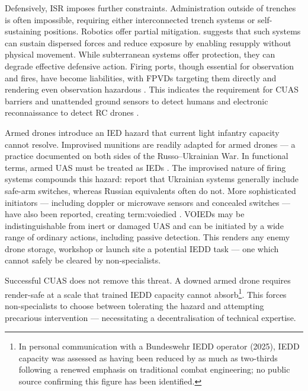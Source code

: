 Defensively, ISR imposes further constraints. Administration outside of trenches is often impossible, requiring either interconnected trench systems or self-sustaining positions. Robotics offer partial mitigation. \textcite[57]{Watling_book} suggests that such systems can sustain dispersed forces and reduce exposure by enabling resupply without physical movement. While subterranean systems offer protection, they can degrade effective defensive action. Firing ports, though essential for observation and fires, have become liabilities, with FPVDs targeting them directly and rendering even observation hazardous \parencite{neron_bancel_2024_05_27,Tyshchenko_2026_03_20_ukraine_bunker_story}. This indicates the requirement for CUAS barriers and unattended ground sensors to detect humans and electronic reconnaissance to detect RC drones \parencite[59]{ZABRODSKYI_2022}.



Armed drones introduce an IED hazard that current light infantry capacity cannot resolve. Improvised munitions are readily adapted for armed drones --- a practice documented on both sides of the Russo--Ukrainian War. In functional terms, armed UAS must be treated as IEDs \parencite{DORD_2022,danny_participant_5}. The improvised nature of firing systems compounds this hazard: \textcite{civdiv_8,dan_participant_1} report that Ukrainian systems generally include safe-arm switches, whereas Russian equivalents often do not. More sophisticated initiators --- including doppler or microwave sensors and concealed switches --- have also been reported, creating \gls{term:voiedied} \parencite{terrogence_2026_1,Terrogence_doppler_radar_initiation_ukraine_2026}. VOIEDs may be indistinguishable from inert or damaged UAS and can be initiated by a wide range of ordinary actions, including passive detection. This renders any enemy drone storage, workshop or launch site a potential IEDD task --- one which cannot safely be cleared by non-specialists.

Successful CUAS does not remove this threat. A downed armed drone requires render-safe at a scale that trained IEDD capacity cannot absorb\footnote{In personal communication with a Bundeswehr IEDD operator (2025), IEDD capacity was assessed as having been reduced by as much as two-thirds following a renewed emphasis on traditional combat engineering; no public source confirming this figure has been identified.}. This forces non-specialists to choose between tolerating the hazard and attempting precarious intervention \parencite[2:58--5:44]{Chosen_9_2024_8_13,garand_thumb_CUAS_2026_3_15} --- necessitating a decentralisation of technical expertise.

